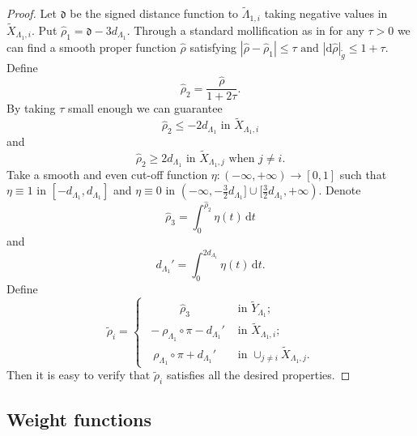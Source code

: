 \documentclass[11pt,letterpaper]{amsart}
\numberwithin{equation}{section}
\theoremstyle{definition}
\newcommand{\ti}[1]{\tilde{#1}}
\begin{document}
\begin{proof}
Let $\mathfrak d$ be the signed distance function to $\ti\Lambda_{1,i}$ taking negative values in $\ti X_{\Lambda_1,i}$. Put
$
\hat \rho_1=\mathfrak d-3d_{\Lambda_1}
$.
Through a standard mollification as in {\cite{GW79}} for any $\tau>0$ we can find a smooth proper function $\hat\rho$ satisfying
$|\hat \rho-\hat \rho_1|\leq \tau \mbox{ and }|\mathrm d\hat \rho|_{\tilde g}\leq 1+\tau. $
Define
$$
\hat\rho_2=\frac{\hat \rho}{1+2\tau}.
$$
By taking $\tau$ small enough we can guarantee $$\hat \rho_2\leq-2d_{\Lambda_1}\mbox{ in } \ti X_{\Lambda_1,i}$$ and $$\hat \rho_2\geq 2d_{\Lambda_1}\mbox{ in }  \ti X_{\Lambda_1,j}\mbox{ when } j\neq i.$$
Take a smooth and even cut-off function $\eta:(-\infty,+\infty)\to [0,1]$ such that $\eta\equiv 1$ in $[-d_{\Lambda_1},d_{\Lambda_1}]$ and $\eta\equiv 0$ in $(-\infty,-\frac{3}{2}d_{\Lambda_1}]\cup[\frac{3}{2}d_{\Lambda_1},+\infty)$. Denote
$$
\hat \rho_3=\int_0^{\hat \rho_2}\eta(t)\,\mathrm dt
$$
and
$$d_{\Lambda_1}'=\int_0^{2d_{\Lambda_1}}\eta(t)\,\mathrm dt.$$
Define
\[
\tilde \rho_i =
\begin{cases}
\quad \quad \quad \hat\rho_3 & \mbox{ in } \ti Y_{\Lambda_1};\\[1mm]
\ -\rho_{\Lambda_1}\circ\pi-d_{\Lambda_1}' & \mbox{ in } \ti X_{\Lambda_1,i};\\[1mm]
\ \ \ \rho_{\Lambda_1}\circ \pi+d_{\Lambda_1}' & \mbox{ in } \cup_{j\neq i} \ti X_{\Lambda_1,j}.
\end{cases}
\]
Then it is easy to verify that $\tilde \rho_i$ satisfies all the desired properties.
\end{proof}

\subsection{Weight functions}
\end{document}
